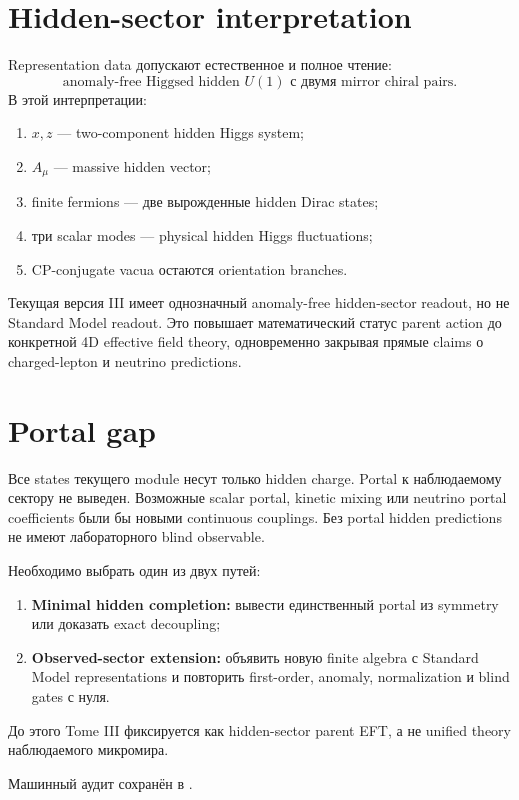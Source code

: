 \section{Hidden-sector interpretation}

Representation data допускают естественное и полное чтение:
\begin{equation}
 \boxed{
 \text{anomaly-free Higgsed hidden }U(1)
 \text{ с двумя mirror chiral pairs}.}
\end{equation}
В этой интерпретации:
\begin{enumerate}
 \item \(x,z\) --- two-component hidden Higgs system;
 \item \(A_\mu\) --- massive hidden vector;
 \item finite fermions --- две вырожденные hidden Dirac states;
 \item три scalar modes --- physical hidden Higgs fluctuations;
 \item CP-conjugate vacua остаются orientation branches.
\end{enumerate}

\begin{theorem}
Текущая версия III имеет однозначный anomaly-free hidden-sector readout,
но не Standard Model readout. Это повышает математический статус parent
action до конкретной 4D effective field theory, одновременно закрывая
прямые claims о charged-lepton и neutrino predictions.
\end{theorem}

\section{Portal gap}

Все states текущего module несут только hidden charge. Portal к
наблюдаемому сектору не выведен. Возможные scalar portal, kinetic mixing
или neutrino portal coefficients были бы новыми continuous couplings.
Без portal hidden predictions не имеют лабораторного blind observable.

\begin{protocol}
Необходимо выбрать один из двух путей:
\begin{enumerate}
 \item \textbf{Minimal hidden completion:} вывести единственный portal из
 symmetry или доказать exact decoupling;
 \item \textbf{Observed-sector extension:} объявить новую finite algebra
 с Standard Model representations и повторить first-order, anomaly,
 normalization и blind gates с нуля.
\end{enumerate}
До этого Tome III фиксируется как hidden-sector parent EFT, а не unified
theory наблюдаемого микромира.
\end{protocol}

Машинный аудит сохранён в
.